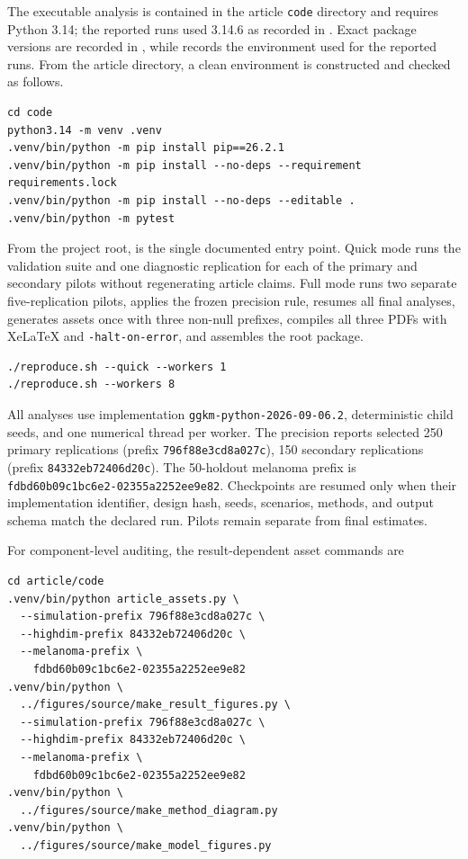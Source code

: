 \documentclass[11pt]{article}
\begin{document}
The executable analysis is contained in the article \texttt{code} directory and requires Python 3.14; the reported runs used 3.14.6 as recorded in . Exact package versions are recorded in , while  records the environment used for the reported runs. From the article directory, a clean environment is constructed and checked as follows.
\begin{verbatim}
cd code
python3.14 -m venv .venv
.venv/bin/python -m pip install pip==26.2.1
.venv/bin/python -m pip install --no-deps --requirement requirements.lock
.venv/bin/python -m pip install --no-deps --editable .
.venv/bin/python -m pytest
\end{verbatim}

From the project root,  is the single documented entry point. Quick mode runs the validation suite and one diagnostic replication for each of the primary and secondary pilots without regenerating article claims. Full mode runs two separate five-replication pilots, applies the frozen precision rule, resumes all final analyses, generates assets once with three non-null prefixes, compiles all three PDFs with XeLaTeX and \texttt{-halt-on-error}, and assembles the root  package.
\begin{verbatim}
./reproduce.sh --quick --workers 1
./reproduce.sh --workers 8
\end{verbatim}

All analyses use implementation \texttt{ggkm-python-2026-09-06.2}, deterministic child seeds, and one numerical thread per worker. The precision reports selected 250 primary replications (prefix \texttt{796f88e3cd8a027c}), 150 secondary replications (prefix \texttt{84332eb72406d20c}). The 50-holdout melanoma prefix is \texttt{fdbd60b09c1bc6e2-02355a2252ee9e82}. Checkpoints are resumed only when their implementation identifier, design hash, seeds, scenarios, methods, and output schema match the declared run. Pilots remain separate from final estimates.

For component-level auditing, the result-dependent asset commands are
\begin{verbatim}
cd article/code
.venv/bin/python article_assets.py \
  --simulation-prefix 796f88e3cd8a027c \
  --highdim-prefix 84332eb72406d20c \
  --melanoma-prefix \
    fdbd60b09c1bc6e2-02355a2252ee9e82
.venv/bin/python \
  ../figures/source/make_result_figures.py \
  --simulation-prefix 796f88e3cd8a027c \
  --highdim-prefix 84332eb72406d20c \
  --melanoma-prefix \
    fdbd60b09c1bc6e2-02355a2252ee9e82
.venv/bin/python \
  ../figures/source/make_method_diagram.py
.venv/bin/python \
  ../figures/source/make_model_figures.py
\end{verbatim}
\end{document}
